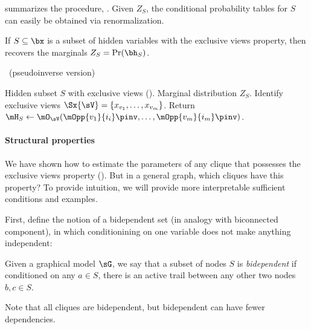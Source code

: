  summarizes the procedure, \LearnClique.
Given $Z_S$, the conditional probability tables for $S$ can easily be
obtained via renormalization.
\begin{theorem}
If $S \subseteq \bx$ is a subset of hidden variables with the exclusive views property,
then  recovers the marginals $Z_S = \Pr(\bh_S)$.
\end{theorem}


\begin{algorithm}
  \caption{\LearnClique~(pseudoinverse version)}
  \label{algo:learnclique}
  \begin{algorithmic}
    \REQUIRE Hidden subset $S$ with exclusive views ().
    \ENSURE Marginal distribution $Z_S$.
      \STATE Identify exclusive views $\Sx{\sV} = \{x_{v_1}, \dots, x_{v_m}\}$.
      \STATE Return $\mH_S \gets \mO_{\sV}( \mOpp{v_1}{i_i}\pinv, \dots, {\mOpp{v_m}{i_m}}\pinv )$.
  \end{algorithmic}
\end{algorithm}

\paragraph{Structural properties}

We have shown how to estimate the parameters of any clique that possesses the exclusive
  views property ().
  But in a general graph, which cliques have this property?
  To provide intuition, we will provide more interpretable sufficient conditions
  and examples.


First, define the notion of a bidependent set (in analogy with biconnected component),
in which conditionining on one variable does not make anything independent:
\begin{definition}
Given a graphical model $\sG$, we say that a subset of nodes $S$ is \emph{bidependent} if
conditioned on any $a \in S$, there is an active trail between any other two nodes $b,c \in S$.
\end{definition}
Note that all cliques are bidependent, but bidependent can have fewer dependencies.

